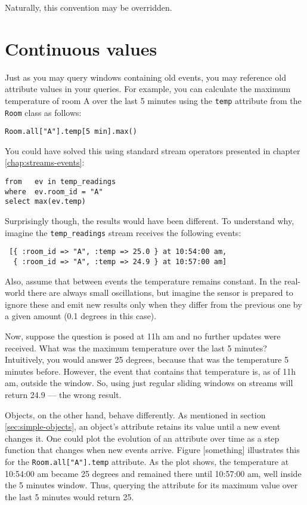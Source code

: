 \documentclass{report}
\begin{document}
Naturally, this convention may be overridden.


\chapter{Continuous values}
\label{chap:continuous-values}

Just as you may query windows containing old events, you may reference
old attribute values in your queries. For example, you can calculate
the maximum temperature of room A over the last 5 minutes using the
\verb=temp= attribute from the \verb=Room= class as follows:

\begin{verbatim}
Room.all["A"].temp[5 min].max()
\end{verbatim}

You could have solved this using standard stream operators presented
in chapter \ref{chap:streams-events}:

\begin{verbatim}
from   ev in temp_readings
where  ev.room_id = "A"
select max(ev.temp)
\end{verbatim}

Surprisingly though, the results would have been different. To
understand why, imagine the \verb=temp_readings= stream receives the
following events:

\begin{verbatim}
 [{ :room_id => "A", :temp => 25.0 } at 10:54:00 am,
  { :room_id => "A", :temp => 24.9 } at 10:57:00 am]
\end{verbatim}

Also, assume that between events the temperature remains constant. In
the real-world there are always small oscillations, but imagine the
sensor is prepared to ignore these and emit new results only when they
differ from the previous one by a given amount (0.1 degrees in this
case).

Now, suppose the question is posed at 11h am and no further updates
were received. What was the maximum temperature over the last 5
minutes? Intuitively, you would answer 25 degrees, because that was
the temperature 5 minutes before. However, the event that contains
that temperature is, as of 11h am, outside the window. So, using just
regular sliding windows on streams will return 24.9 --- the wrong
result.

Objects, on the other hand, behave differently. As mentioned in
section \ref{sec:simple-objects}, an object's attribute retains its
value until a new event changes it. One could plot the evolution of an
attribute over time as a step function that changes when new events
arrive. Figure [something] illustrates this for the
\verb=Room.all["A"].temp= attribute. As the plot shows, the
temperature at 10:54:00 am became 25 degrees and remained there until
10:57:00 am, well inside the 5 minutes window. Thus, querying the
attribute for its maximum value over the last 5 minutes would return
25.
\end{document}
